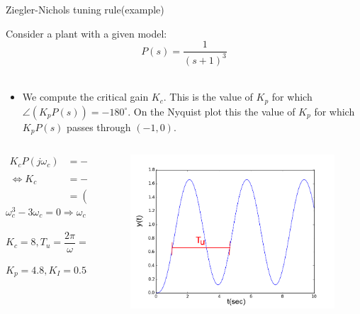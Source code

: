 \begin{frame}{Ziegler-Nichols tuning rule(example)}
	\vspace{-1em}
	\footnotesize{
	\begin{example}
		Consider a plant with a given model:\\
		\vspace{-0.5em}
		$$ P(s) = \frac{1}{(s+1)^3} $$\\
		\vspace{-0.7em}
		\begin{itemize}
		\item We compute the critical gain $K_c$. This is the value of $K_p$ for which $\angle (K_p P(s)) = - 180^\circ$. On the Nyquist plot this the value of $K_p$ for which $K_p P(s)$ passes through $(-1,0)$.\\
		\end{itemize}
		\vspace{-1.5em}
		\begin{columns}
			\begin{column}{0.5 \textwidth}
				\begin{align*}
				K_cP(j\omega_c) &= -1 \\ \Leftrightarrow K_c &= 	-(j\omega_c + 1)^3 \\
				& = (3\omega_c^2-1)+j(\omega_c^3 - 3\omega_c)
				\end{align*}
				\vspace{-1.5em}
				$$ \omega_c^3-3\omega_c = 0 \Rightarrow \omega_c = \sqrt{3}$$\\
				\vspace{-1.5em}
				$$K_c = 8, T_u = \frac{2\pi}{\omega} = 3.628$$\\
				\vspace{-1.5em}
				$$K_p = 4.8, K_I = 0.551  K_p, K_d =  0.45 K_p$$
			\end{column}
			\begin{column}{0.4 \textwidth}
			\begin{figure}
				\centering
				\includegraphics[width=1\linewidth]{img/Z_N_PID_example}
			\end{figure}
			\end{column}
		\end{columns}
	\end{example}}
\end{frame}

